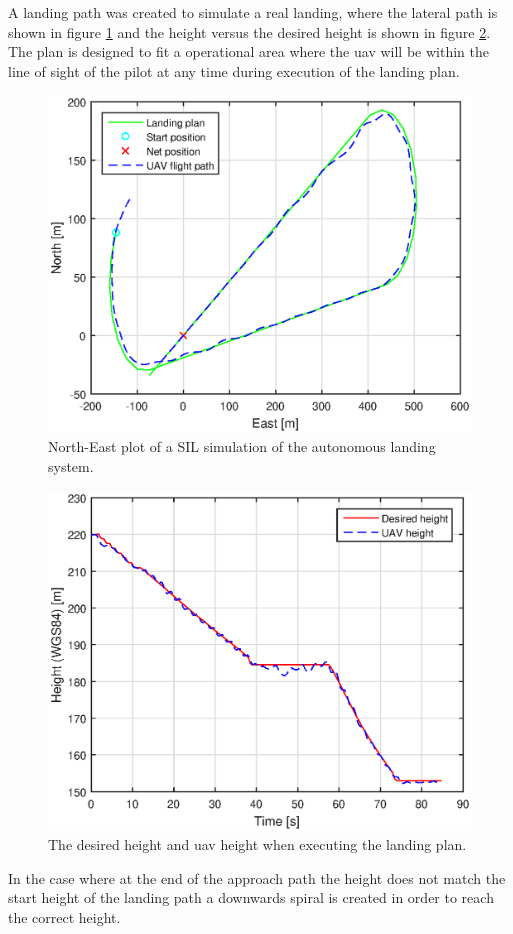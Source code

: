 A landing path was created to simulate a real landing, where the lateral path is shown in figure \ref{Fig:SILNorthEast090145} and the height versus the desired height is shown in figure \ref{Fig:SILHeight6juni090145}. The plan is designed to fit a operational area where the \gls{uav} will be within the line of sight of the pilot at any time during execution of the landing plan.
\begin{figure}[H]
\centering
\includegraphics[scale=0.7]{figs/SysPlot/SILNorthEast6juni090145.eps}
\caption{North-East plot of a SIL simulation of the autonomous landing system.}
\label{Fig:SILNorthEast090145}
\end{figure}
\begin{figure}[H]
\centering
\includegraphics[scale=0.7]{figs/SysPlot/SILHeight6juni090145.eps}
\caption{The desired height and \gls{uav} height when executing the landing plan.}
\label{Fig:SILHeight6juni090145}
\end{figure}
In the case where at the end of the approach path the height does not match the start height of the landing path a downwards spiral is created in order to reach the correct height.

